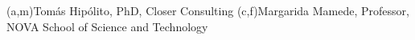 %
%
%
%
(a,m){Tomás Hipólito, PhD, Closer Consulting}
(c,f){Margarida Mamede, Professor, NOVA School of Science and Technology}



%
%
%
%
